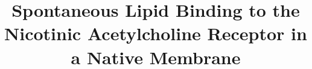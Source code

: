 \documentclass[%
 aip,
 amsmath,amssymb,
 preprint,%
]{revtex4-1}\usepackage{setspace}
\begin{document}



\title{Spontaneous Lipid Binding to the Nicotinic Acetylcholine Receptor in a Native Membrane}


%
\end{document}
